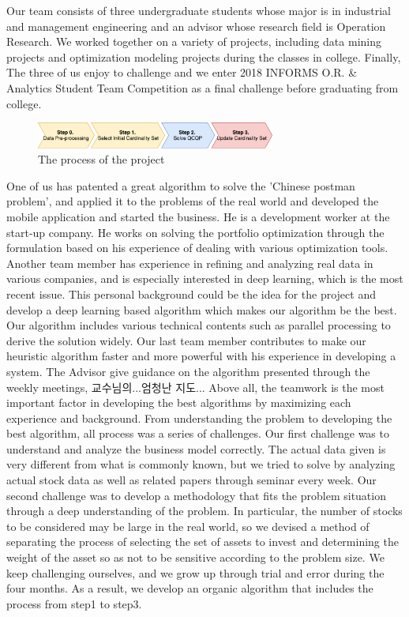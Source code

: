 \documentclass[11pt]{article}
\begin{document}
	Our team consists of three undergraduate students whose major is in industrial and management engineering and an advisor whose research field is Operation Research. We worked together on a variety of projects, including data mining projects and optimization modeling projects during the classes in college. Finally, The three of us enjoy to challenge and we enter 2018 INFORMS O.R. {\&} Analytics Student Team Competition as a final challenge before graduating from college. 
	\begin{figure}[h] 
		\begin{center}
			\includegraphics[width=0.7\textwidth]{process2}
			\caption{The process of the project} \label{fig:process}
		\end{center}
	\end{figure}
	One of us has patented a great algorithm to solve the 'Chinese postman problem’, and applied it to the problems of the real world and developed the mobile application and started the business. He is a development worker at the start-up company. He works on solving the portfolio optimization through the formulation based on his experience of dealing with various optimization tools. Another team member has experience in refining and analyzing real data in various companies, and is especially interested in deep learning,  which is the most recent issue. This personal background could be the idea for the project and develop a deep learning based algorithm which makes our algorithm be the best. Our algorithm includes various technical contents such as parallel processing to derive the solution widely. Our last team member contributes to make our heuristic algorithm faster and more powerful with his experience in developing a system. The Advisor give guidance on the algorithm presented through the weekly meetings, 교수님의...엄청난 지도... Above all, the teamwork is the most important factor in developing the best algorithms by maximizing each experience and background. 
	From understanding the problem to developing the best algorithm, all process was a series of challenges. Our first challenge was to understand and analyze the business model correctly. The actual data given is very different from what is commonly known, but we tried to solve by analyzing actual stock data as well as related papers through seminar every week. Our second challenge was to develop a methodology that fits the problem situation through a deep understanding of the problem. In particular, the number of stocks to be considered may be large in the real world, so we devised a method of separating the process of selecting the set of assets to invest and determining the weight of the asset so as not to be sensitive according to the problem size.
	We keep challenging ourselves, and we grow up through trial and error during the four months. As a result, we develop an organic algorithm that includes the process from step1 to step3. 
	
\end{document}
